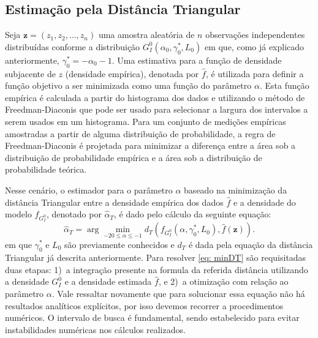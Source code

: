 \subsection{Estimação pela Distância Triangular}

Seja $\bm z = (z_1, z_2, \dots, z_n)$ uma amostra aleatória de $n$ observações independentes distribuídas conforme a distribuição $G_I^0(\alpha_0, \gamma_0^{*}, L_0)$ em que, como já explicado anteriormente, $\gamma_0^{*} = - \alpha_0 - 1$. Uma estimativa para a função de densidade subjacente de $z$ (densidade empírica), denotada por $\widehat{f}$, é utilizada para definir a função objetivo a ser minimizada como uma função do parâmetro $\alpha$. Esta função empírica é calculada a partir do histograma dos dados e utilizando o método de Freedman-Diaconis que pode ser usado para selecionar a largura dos intervalos a serem usados em um histograma. Para um conjunto de medições empíricas amostradas a partir de alguma distribuição de probabilidade, a regra de Freedman-Diaconis \citep{FreedmanDiaconis} é projetada para minimizar a diferença entre a área sob a distribuição de probabilidade empírica e a área sob a distribuição de probabilidade teórica. 

Nesse cenário, o estimador para o parâmetro $\alpha$ baseado na minimização da distância Triangular entre a densidade empírica dos dados $\widehat{f}$ e a densidade do modelo $f_{G_I^0}$, denotado por $\widehat{\alpha}_{T}$, é dado pelo cálculo da seguinte equação:
\begin{equation}
    \widehat{\alpha}_{T} = \arg\min_{-20 \leq \alpha \leq -1} d_T(f_{G_I^0}(\alpha, \gamma_0^{*}, L_0), \widehat{f}(\bm z)) .
    \label{eq: minDT}
\end{equation}
em que $\gamma_0^{*}$ e $L_0$ são previamente conhecidos e $d_T$ é dada pela equação da distância Triangular já descrita anteriormente. 
Para resolver \eqref{eq: minDT} são requisitadas duas etapas: 
1)~a integração presente na formula da referida distância utilizando a densidade $G_I^0$ e a densidade estimada $\widehat{f}$, e 
2)~a otimização com relação ao parâmetro $\alpha$. 
Vale ressaltar novamente que para solucionar essa equação não há resultados analíticos explícitos, por isso devemos recorrer a procedimentos numéricos. 
O intervalo de busca é fundamental, sendo estabelecido para evitar instabilidades numéricas nos cálculos realizados.
